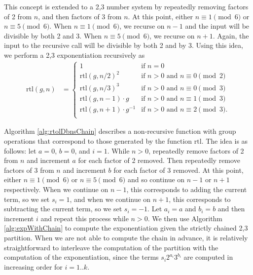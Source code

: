 \documentclass{ucalgthes1}
\theoremstyle{definition}
\begin{document}
This concept is extended to a 2,3 number system by repeatedly removing factors of 2 from $n$, and then factors of 3 from $n$.  At this point, either $n \equiv 1 \pmod 6$ or $n \equiv 5 \pmod 6$.  When $n \equiv 1 \pmod 6$, we recurse on $n-1$ and the input will be divisible by both 2 and 3.  When $n \equiv 5 \pmod 6$, we recurse on $n+1$.  Again, the input to the recursive call will be divisible by both 2 and by 3.  Using this idea, we perform a 2,3 exponentiation recursively as
\newcommand{\rtol}{\textrm{rtl}}
\begin{align*}
\rtol(g, n) &= \begin{cases}
               1 & \textrm{if $n = 0$} \\
               {\rtol(g, n/2)}^2 & \textrm{if $n > 0$ and $n \equiv 0 \pmod 2$} \\
               {\rtol(g, n/3)}^3 & \textrm{if $n > 0$ and $n \equiv 0 \pmod 3$} \\
               \rtol(g, n-1) \cdot g & \textrm{if $n > 0$ and $n \equiv 1 \pmod 3$} \\
               \rtol(g, n+1) \cdot g^{-1} & \textrm{if $n > 0$ and $n \equiv 2 \pmod 3$}. \\
	       \end{cases}
\end{align*}

Algorithm \ref{alg:rtolDbnsChain} describes a non-recursive function with group operations that correspond to those generated by the function $\rtol$.  The idea is as follows: let $a = 0$, $b=0$, and $i=1$.  While $n > 0$, repeatedly remove factors of 2 from $n$ and increment $a$ for each factor of 2 removed. Then repeatedly remove factors of 3 from $n$ and increment $b$ for each factor of 3 removed. At this point, either $n \equiv 1 \pmod 6$ or $n \equiv 5 \pmod 6$ and so continue on $n-1$ or $n+1$ respectively.  When we continue on $n-1$, this corresponds to adding the current term, so we set $s_i=1$, and when we continue on $n+1$, this corresponds to subtracting the current term, so we set $s_i=-1$. Let $a_i = a$ and $b_i = b$ and then increment $i$ and repeat this process while $n > 0$.  We then use Algorithm \ref{alg:expWithChain} to compute the exponentiation given the strictly chained 2,3 partition.  When we are not able to compute the chain in advance, it is relatively straightforward to interleave the computation of the partition with the computation of the exponentiation, since the terms $s_i2^{a_i}3^{b_i}$ are computed in increasing order for $i=1..k$.
\end{document}
